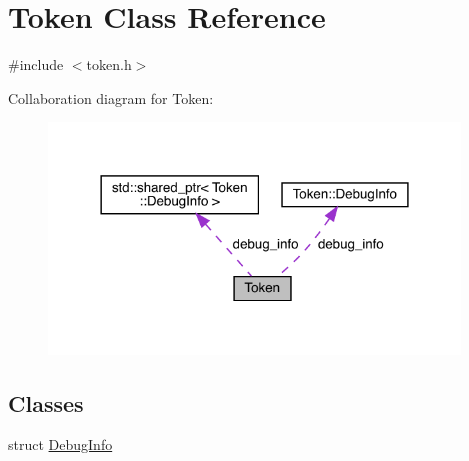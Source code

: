 \hypertarget{class_token}{}\section{Token Class Reference}
\label{class_token}


{\ttfamily \#include $<$token.\+h$>$}



Collaboration diagram for Token\+:
\nopagebreak
\begin{figure}[H]
\begin{center}
\leavevmode
\includegraphics[width=310pt]{class_token__coll__graph}
\end{center}
\end{figure}
\subsection*{Classes}
\begin{DoxyCompactItemize}
\item 
struct \hyperlink{struct_token_1_1_debug_info}{Debug\+Info}
\end{DoxyCompactItemize}
